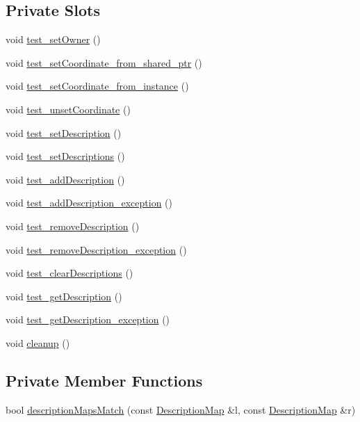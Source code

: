 \subsection*{Private Slots}
\begin{DoxyCompactItemize}
\item 
void \hyperlink{classdefault__gameobjects_a1b2f12a75a6fd560d34f32b5ba0f34da}{test\-\_\-set\-Owner} ()
\item 
void \hyperlink{classdefault__gameobjects_aaa9c0152f449c606500cf96690ae3c13}{test\-\_\-set\-Coordinate\-\_\-from\-\_\-shared\-\_\-ptr} ()
\item 
void \hyperlink{classdefault__gameobjects_a0883afe617123263ad602f87fa983683}{test\-\_\-set\-Coordinate\-\_\-from\-\_\-instance} ()
\item 
void \hyperlink{classdefault__gameobjects_af2580d926eca2aa41826048b3726fc4f}{test\-\_\-unset\-Coordinate} ()
\item 
void \hyperlink{classdefault__gameobjects_a2ab3a9693bab4ec2e85cba63caa0785e}{test\-\_\-set\-Description} ()
\item 
void \hyperlink{classdefault__gameobjects_afdd9756c0869ae023c8c45fb69461398}{test\-\_\-set\-Descriptions} ()
\item 
void \hyperlink{classdefault__gameobjects_a75efd7811b51bb6ec4cb25d72f4421f0}{test\-\_\-add\-Description} ()
\item 
void \hyperlink{classdefault__gameobjects_af802e807c97f51c84bc85d5014d556e0}{test\-\_\-add\-Description\-\_\-exception} ()
\item 
void \hyperlink{classdefault__gameobjects_a5f1f3f3f10bcee841f5382ecd7a4e105}{test\-\_\-remove\-Description} ()
\item 
void \hyperlink{classdefault__gameobjects_aaa05cc0bc58d54582a72fb6b457fd01c}{test\-\_\-remove\-Description\-\_\-exception} ()
\item 
void \hyperlink{classdefault__gameobjects_a38dba54182b375ed1592ef3938bb7dbe}{test\-\_\-clear\-Descriptions} ()
\item 
void \hyperlink{classdefault__gameobjects_ae344b74fe80ba55e68709e9ef01291fa}{test\-\_\-get\-Description} ()
\item 
void \hyperlink{classdefault__gameobjects_aa30ca9e1cf57f614e04e0dea59cd4b46}{test\-\_\-get\-Description\-\_\-exception} ()
\item 
void \hyperlink{classdefault__gameobjects_ad7edaff14ef790a4b4ad005398d63c50}{cleanup} ()
\end{DoxyCompactItemize}
\subsection*{Private Member Functions}
\begin{DoxyCompactItemize}
\item 
bool \hyperlink{classdefault__gameobjects_af7997108c7d76177f670658c155bdbfb}{description\-Maps\-Match} (const \hyperlink{namespaceCourse_aed04c39dde5a591d4b353686d3d0e306}{Description\-Map} \&l, const \hyperlink{namespaceCourse_aed04c39dde5a591d4b353686d3d0e306}{Description\-Map} \&r)
\end{DoxyCompactItemize}
